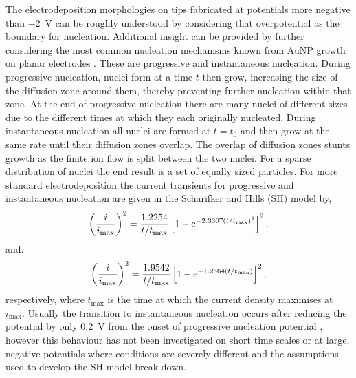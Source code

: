 \documentclass{article}
\begin{document}
The electrodeposition morphologies on tips fabricated at potentials more negative than \SI{-2}{V} can be roughly understood by considering that overpotential as the boundary for nucleation. Additional insight can be provided by further considering the most common nucleation mechanisms known from AuNP growth on planar electrodes \cite{scharifker1983}. These are progressive and instantaneous nucleation. During progressive nucleation, nuclei form at a time $t$ then grow, increasing the size of the diffusion zone around them, thereby preventing further nucleation within that zone. At the end of progressive nucleation there are many nuclei of different sizes due to the different times at which they each originally nucleated. During instantaneous nucleation all nuclei are formed at $t=t_0$ and then grow at the same rate until their diffusion zones overlap. The overlap of diffusion zones stunts growth as the finite ion flow is split between the two nuclei. For a sparse distribution of nuclei the end result is a set of equally sized particles. For more standard electrodeposition the current transients for progressive and instantaneous nucleation are given in the Scharifker and Hills (SH) model by,
\begin{equation}
\left(\frac{i}{i_{\mathrm{max}}}\right)^2 = \frac{1.2254}{t/t_{\mathrm{max}}} \left[ 1 - \mathrm{e}^{-2.3367(t/t_{\mathrm{max}})^2} \right]^2,
\label{eq:prog_nucleation}
\end{equation}
and.
\begin{equation}
\left(\frac{i}{i_{\mathrm{max}}}\right)^2 = \frac{1.9542}{t/t_{\mathrm{max}}} \left[ 1 - \mathrm{e}^{-1.2564(t/t_{\mathrm{max}})} \right]^2,
\label{eq:inst_nucleation}
\end{equation}
respectively, where $t_{\mathrm{max}}$ is the time at which the current density maximises at $i_{\mathrm{max}}$. Usually the transition to instantaneous nucleation occurs after reducing the potential by only \SI{0.2}{V} from the onset of progressive nucleation potential \cite{komsiyska2008}, however this behaviour has not been investigated on short time scales or at large, negative potentials where conditions are severely different and the assumptions used to develop the SH model break down.
\end{document}
